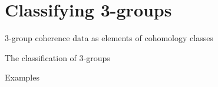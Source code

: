 \section{Classifying 3-groups}

\begin{prop} 3-group coherence data as elements of cohomology classes \end{prop}

\begin{thm} The classification of 3-groups \end{thm}

\begin{example} Examples \end{example}